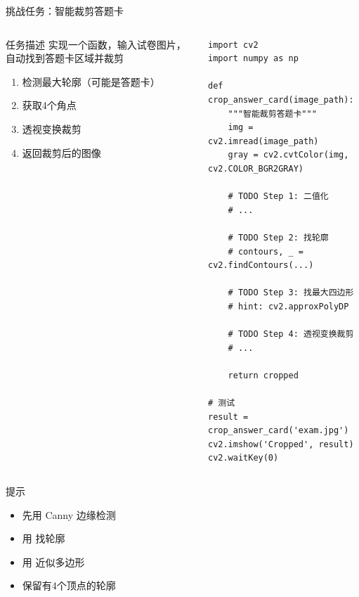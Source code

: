 \begin{frame}[fragile]{挑战任务：智能裁剪答题卡}
    \begin{columns}
        \begin{block}{任务描述}
            实现一个函数，输入试卷图片，自动找到答题卡区域并裁剪

            \begin{enumerate}
                \item 检测最大轮廓（可能是答题卡）
                \item 获取4个角点
                \item 透视变换裁剪
                \item 返回裁剪后的图像
            \end{enumerate}
        \end{block}

        \begin{lstlisting}[basicstyle=\ttfamily\scriptsize]
import cv2
import numpy as np

def crop_answer_card(image_path):
    """智能裁剪答题卡"""
    img = cv2.imread(image_path)
    gray = cv2.cvtColor(img, cv2.COLOR_BGR2GRAY)

    # TODO Step 1: 二值化
    # ...

    # TODO Step 2: 找轮廓
    # contours, _ = cv2.findContours(...)

    # TODO Step 3: 找最大四边形
    # hint: cv2.approxPolyDP

    # TODO Step 4: 透视变换裁剪
    # ...

    return cropped

# 测试
result = crop_answer_card('exam.jpg')
cv2.imshow('Cropped', result)
cv2.waitKey(0)
        \end{lstlisting}
    \end{columns}

    \begin{alertblock}{提示}
        \begin{itemize}
            \item 先用 Canny 边缘检测
            \item 用  找轮廓
            \item 用  近似多边形
            \item 保留有4个顶点的轮廓
        \end{itemize}
    \end{alertblock}
\end{frame}
